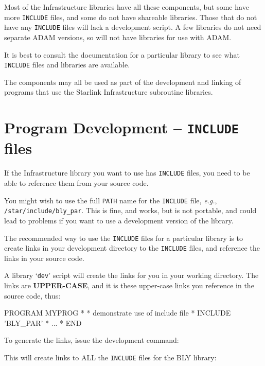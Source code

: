 \documentclass[twoside,11pt,nolof]{starlink}
\begin{document}
Most of the Infrastructure libraries have all these components, but some
have more \texttt{INCLUDE} files, and some do not have shareable libraries.
Those that do not have any \texttt{INCLUDE} files will lack a development
script.  A few libraries do not need separate ADAM versions, so will not
have libraries for use with ADAM.

It is best to consult the documentation for a particular library to see
what \texttt{INCLUDE} files and libraries are available.

The components may all be used as part of the development and linking of
programs that use the Starlink Infrastructure subroutine libraries.

\section{Program Development -- \texttt{INCLUDE} files}
\label{program_development}

If the Infrastructure library you want to use has \texttt{INCLUDE} files, you
need to be able to reference them from your source code.

You might wish to use the full \texttt{PATH} name for the \texttt{INCLUDE}
file, \emph{e.g.}, \texttt{/star/include/bly\_par}.  This is fine, and works,
but is not portable, and could lead to problems if you want to use a
development version of the library.

The recommended way to use the \texttt{INCLUDE} files for a particular
library is to create links in your development directory to the \texttt{INCLUDE} files, and reference the links in your source code.

A library `\texttt{dev}' script will create the links for you in your
working directory.  The links are \textbf{UPPER-CASE}, and it is these
upper-case links you reference in the source code, thus:

\begin{terminalv}
      PROGRAM MYPROG
*
*  demonstrate use of include file
*
      INCLUDE 'BLY_PAR'
*
      ...
*
      END
\end{terminalv}

To generate the links, issue the development command:

\begin{terminalv}
\end{terminalv}

This will create links to ALL the \texttt{INCLUDE} files for the BLY library:
\end{document}
